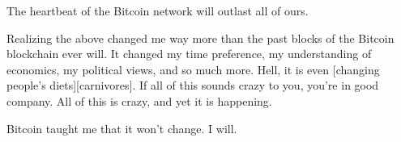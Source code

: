 
The heartbeat of the Bitcoin network will outlast all of ours.

Realizing the above changed me way more than the past blocks of the
Bitcoin blockchain ever will. It changed my time preference, my
understanding of economics, my political views, and so much more. Hell,
it is even [changing people's diets][carnivores]. If all of this sounds crazy to
you, you're in good company. All of this is crazy, and yet it is
happening.

Bitcoin taught me that it won't change. I will.

%
%
%
%
%
%
%
%
%
